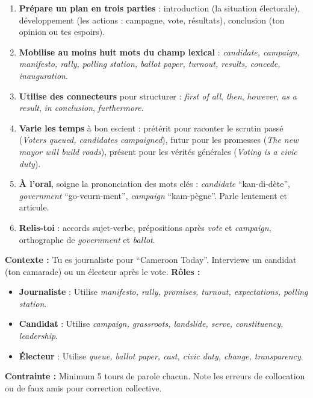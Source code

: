 \documentclass[11pt]{article}
\begin{document}
\begin{methode}
\begin{enumerate}
\item \textbf{Prépare un plan en trois parties} : introduction (la situation électorale), développement (les actions : campagne, vote, résultats), conclusion (ton opinion ou tes espoirs).
\item \textbf{Mobilise au moins huit mots du champ lexical} : \emph{candidate, campaign, manifesto, rally, polling station, ballot paper, turnout, results, concede, inauguration}.
\item \textbf{Utilise des connecteurs} pour structurer : \emph{first of all}, \emph{then}, \emph{however}, \emph{as a result}, \emph{in conclusion}, \emph{furthermore}.
\item \textbf{Varie les temps} à bon escient : prétérit pour raconter le scrutin passé (\emph{Voters queued, candidates campaigned}), futur pour les promesses (\emph{The new mayor will build roads}), présent pour les vérités générales (\emph{Voting is a civic duty}).
\item \textbf{À l'oral}, soigne la prononciation des mots clés : \emph{candidate} “kan-di-dète”, \emph{government} “go-veurn-ment”, \emph{campaign} “kam-pègne”. Parle lentement et articule.
\item \textbf{Relis-toi} : accords sujet-verbe, prépositions après \emph{vote} et \emph{campaign}, orthographe de \emph{government} et \emph{ballot}.
\end{enumerate}
\end{methode}

\begin{experience}
\textbf{Contexte :} Tu es journaliste pour “Cameroon Today”. Interviewe un candidat (ton camarade) ou un électeur après le vote.
\textbf{Rôles :}
\begin{itemize}
\item \textbf{Journaliste} : Utilise \emph{manifesto, rally, promises, turnout, expectations, polling station}.
\item \textbf{Candidat} : Utilise \emph{campaign, grassroots, landslide, serve, constituency, leadership}.
\item \textbf{Électeur} : Utilise \emph{queue, ballot paper, cast, civic duty, change, transparency}.
\end{itemize}
\textbf{Contrainte :} Minimum 5 tours de parole chacun. Note les erreurs de collocation ou de faux amis pour correction collective.
\end{experience}
\end{document}
